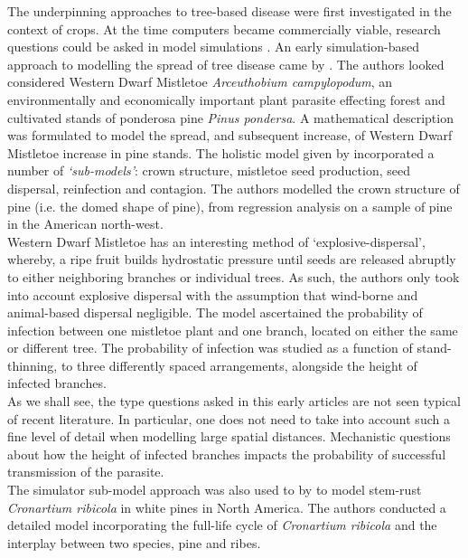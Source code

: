 The underpinning approaches to tree-based disease were first investigated in the context of crops. At the time computers became commercially viable, research questions could be asked in model simulations \cite{dixon1979spread}. An early simulation-based approach to modelling the spread of tree disease came by \cite{strand1976simulation}. The authors looked considered Western Dwarf Mistletoe \textit{Arceuthobium campylopodum}, an environmentally and economically important plant parasite effecting forest and cultivated stands of ponderosa pine \textit{Pinus pondersa}. A mathematical description was formulated to model the spread, and subsequent increase, of Western Dwarf Mistletoe increase in pine stands. The holistic model given by \cite{strand1976simulation} incorporated a number of \textit{`sub-models'}: crown structure, mistletoe seed production, seed dispersal, reinfection and contagion. The authors modelled the crown structure of pine (i.e. the domed shape of pine), from regression analysis on a sample of pine in the American north-west.\\

 Western Dwarf Mistletoe has an interesting method of `explosive-dispersal', whereby, a ripe fruit builds hydrostatic pressure until seeds are released abruptly to either neighboring branches or individual trees. As such, the authors only took into account explosive dispersal with the assumption that wind-borne and animal-based dispersal negligible. The model ascertained the probability of infection between one mistletoe plant and one branch, located on either the same or different tree. The probability of infection was studied as a function of stand-thinning, to three differently spaced arrangements, alongside the height of infected branches.\\
 
 As we shall see, the type questions asked in this early articles are not seen typical of recent literature. In particular, one does not need to take into account such a fine level of detail when modelling large spatial distances. Mechanistic questions about how the height of infected branches impacts the probability of successful transmission of the parasite.\\
 
 The simulator sub-model approach was also used to by \cite{mcdonald1981computer} to model stem-rust \textit{Cronartium ribicola} in white pines in North America. The authors conducted a detailed model incorporating the full-life cycle of \textit{Cronartium ribicola} and the interplay between two species, pine and ribes.\\
 
